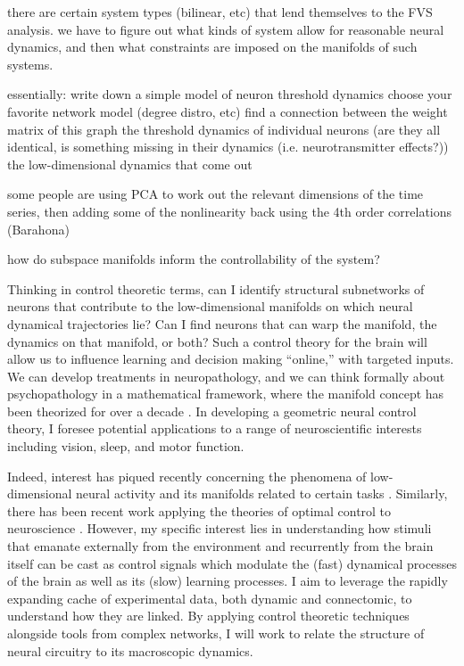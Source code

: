 \documentclass[a4paper,12pt]{article}
\begin{document}
	there are certain system types (bilinear, etc) that lend themselves to the FVS analysis. we have to figure out what kinds of system allow for reasonable neural dynamics, and then what constraints are imposed on the manifolds of such systems. 


essentially:
	write down a simple model of neuron threshold dynamics 
	choose your favorite network model (degree distro, etc)
	find a connection between 
		the weight matrix of this graph 
		the threshold dynamics of individual neurons (are they all identical, is something missing in their dynamics (i.e. neurotransmitter effects?))
		the low-dimensional dynamics that come out

some people are using PCA to work out the relevant dimensions of the time series, then adding some of the nonlinearity back using the 4th order correlations (Barahona)

how do subspace manifolds inform the controllability of the system? 



Thinking in control theoretic terms, can I identify structural subnetworks of neurons that contribute to the low-dimensional manifolds on which neural dynamical trajectories lie? Can I find neurons that can warp the manifold, the dynamics on that manifold, or both? Such a control theory for the brain will allow us to influence learning and decision making ``online,'' with targeted inputs. We can develop treatments in neuropathology, and we can think formally about psychopathology in a mathematical framework, where the manifold concept has been theorized for over a decade \cite{Gallese2003}. In developing a geometric neural control theory, I foresee potential applications to a range of neuroscientific interests including vision, sleep, and motor function. 


Indeed, interest has piqued recently concerning the phenomena of low-dimensional neural activity and its manifolds related to certain tasks \cite{Gao2015, Gao2017, Sadtler2014}. Similarly, there has been recent work applying the theories of optimal control to neuroscience \cite{Schiff2012}. However, my specific interest lies in understanding how stimuli that emanate externally from the environment and recurrently from the brain itself can be cast as control signals which modulate the (fast) dynamical processes of the brain as well as its (slow) learning processes. I aim to leverage the rapidly expanding cache of experimental data, both dynamic and connectomic, to understand how they are linked. By applying control theoretic techniques alongside tools from complex networks, I will work to relate the structure of neural circuitry to its macroscopic dynamics. 
\end{document}
